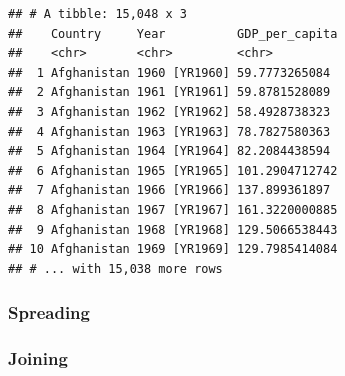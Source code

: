 \documentclass[12pt,]{article}
\newenvironment{Shaded}{\begin{snugshade}}{\end{snugshade}}
\newcommand{\KeywordTok}[1]{\textcolor[rgb]{0.13,0.29,0.53}{\textbf{#1}}}
\newcommand{\DataTypeTok}[1]{\textcolor[rgb]{0.13,0.29,0.53}{#1}}
\newcommand{\DecValTok}[1]{\textcolor[rgb]{0.00,0.00,0.81}{#1}}
\newcommand{\StringTok}[1]{\textcolor[rgb]{0.31,0.60,0.02}{#1}}
\newcommand{\OperatorTok}[1]{\textcolor[rgb]{0.81,0.36,0.00}{\textbf{#1}}}
\newcommand{\NormalTok}[1]{#1}
\begin{document}
\begin{Shaded}
\end{Shaded}

\begin{verbatim}
## # A tibble: 15,048 x 3
##    Country     Year          GDP_per_capita
##    <chr>       <chr>         <chr>         
##  1 Afghanistan 1960 [YR1960] 59.7773265084 
##  2 Afghanistan 1961 [YR1961] 59.8781528089 
##  3 Afghanistan 1962 [YR1962] 58.4928738323 
##  4 Afghanistan 1963 [YR1963] 78.7827580363 
##  5 Afghanistan 1964 [YR1964] 82.2084438594 
##  6 Afghanistan 1965 [YR1965] 101.2904712742
##  7 Afghanistan 1966 [YR1966] 137.899361897 
##  8 Afghanistan 1967 [YR1967] 161.3220000885
##  9 Afghanistan 1968 [YR1968] 129.5066538443
## 10 Afghanistan 1969 [YR1969] 129.7985414084
## # ... with 15,038 more rows
\end{verbatim}

\subsubsection{Spreading}\label{spreading}

\subsubsection{Joining}\label{joining}
\end{document}
